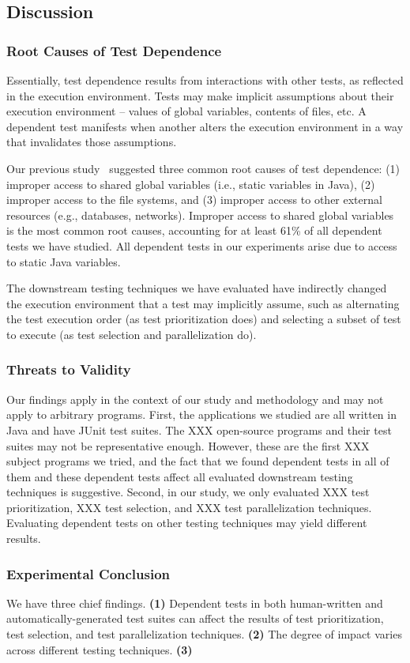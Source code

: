\subsection{Discussion}

\subsubsection{Root Causes of Test Dependence}

Essentially, test dependence results from
interactions with other tests, as reflected in
the execution environment. Tests may make
implicit assumptions about their execution environment --
values of global variables, contents of files, etc. A dependent
test manifests when another alters the execution environment
in a way that invalidates those assumptions.

Our previous study~\cite{} suggested three common
root causes of test dependence: (1) improper access
to shared global variables (i.e., static
variables in Java), (2) improper access
to the file systems, and (3) improper access
to other external resources (e.g., databases,
networks). Improper access to
shared global variables is the most common
root causes, accounting for at least 61\% of 
all dependent tests we have studied. All dependent
tests in our experiments arise due to access
to static Java variables.

The downstream testing techniques we have evaluated
have indirectly changed the execution environment
that a test may implicitly assume, such as alternating
the test execution order (as test prioritization
does) and selecting a subset of
test to execute (as test selection and parallelization
do).



\subsubsection{Threats to Validity}

Our findings apply in the context of our
study and methodology and may not apply to arbitrary
programs. First, the applications we studied are all written
in Java and have JUnit test suites.
The XXX open-source programs and
their test suites may not be representative enough.
However, these are the first XXX subject programs we
tried, and the fact that we found dependent tests in all of
them and these dependent tests affect all evaluated
downstream testing techniques is suggestive.
Second, in our study, we only evaluated XXX
test prioritization, XXX test selection, and
XXX test parallelization techniques. Evaluating
dependent tests on other testing techniques
may yield different results.

\subsubsection{Experimental Conclusion}

We have three chief findings. \textbf{(1)}
Dependent tests in both human-written
and automatically-generated test suites
can affect the results of test prioritization,
test selection, and test parallelization
techniques. \textbf{(2)} The degree of 
impact varies across different testing
techniques. 
\textbf{(3)} 
